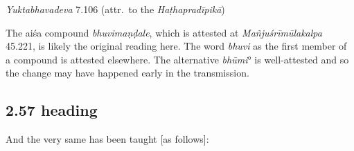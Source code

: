 \begin{ekdosis}
\begin{testimonia}[hp02_056]
\emph{Yuktabhavadeva} 7.106 (attr.~to the \emph{Haṭhapradīpikā})

\begin{versinnote}
\end{versinnote}

\end{testimonia}

\begin{philcomm}[hp02_056]
The aiśa compound \emph{bhuvimaṇḍale}, which is attested at \emph{Mañjuśrīmūlakalpa} 45.221, is likely the original reading here. The word  \emph{bhuvi} as the first member of a compound is attested elsewhere. The alternative \emph{bhūmi}° is well-attested and so the change may have happened early in the transmission. 
\end{philcomm}


\subsection*{2.57 heading}
\begin{translation}[hp02_057a]
And the very same has been taught [as follows]:
\end{translation}



\end{ekdosis}
